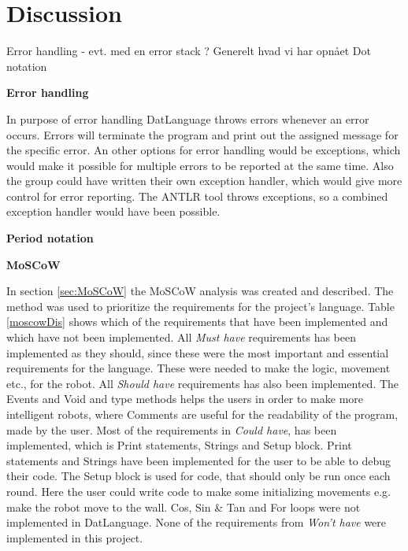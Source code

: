 \chapter{Discussion}
\label{chap:Discussion}

Error handling - evt. med en error stack ?
Generelt hvad vi har opnået
Dot notation

\textbf{\LARGE{Error handling}}

In purpose of error handling DatLanguage throws errors whenever an error occurs. Errors will terminate the program and print out the assigned message for the specific error.
An other options for error handling would be exceptions, which would make it possible for multiple errors to be reported at the same time. Also the group could have written their own exception handler, which would give more control for error reporting. The ANTLR tool throws exceptions, so a combined exception handler would have been possible. \newline

\textbf{\LARGE{Period notation}}



\textbf{\LARGE{MoSCoW}}

In section \ref{sec:MoSCoW} the MoSCoW analysis was created and described. The method was used to prioritize the requirements for the project's language. Table \ref{moscowDis} shows which of the requirements that have been implemented and which have not been implemented. \newline
All \textit{Must have} requirements has been implemented as they should, since these were the most important and essential requirements for the language. These were needed to make the logic, movement etc., for the robot. \newline
All \textit{Should have} requirements has also been implemented. The Events and Void and type methods helps the users in order to make more intelligent robots, where Comments are useful for the readability of the program, made by the user. \newline
Most of the requirements in \textit{Could have}, has been implemented, which is Print statements, Strings and Setup block. Print statements and Strings have been implemented for the user to be able to debug their code. The Setup block is used for code, that should only be run once each round. Here the user could write code to make some initializing movements e.g. make the  robot move to the wall. Cos, Sin \& Tan and For loops were not implemented in DatLanguage. \newline
None of the requirements from \textit{Won't have} were implemented in this project.

